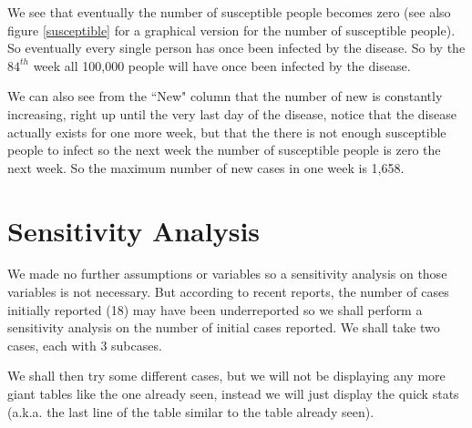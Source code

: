 \documentclass[12pt]{report}
\begin{document}


We see that eventually the number of susceptible people becomes zero (see also figure \ref{susceptible} for a graphical version for the number of susceptible people). So eventually every single person has once been infected by the disease. So by the $84^{th}$ week all 100,000 people will have once been infected by the disease.

\bigskip

We can also see from the ``New" column that the number of new is constantly increasing, right up until the very last day of the disease, notice that the disease actually exists for one more week, but that the there is not enough susceptible people to infect so the next week the number of susceptible people is zero the next week. So the maximum number of new cases in one week is 1,658.

\bigskip

\section{Sensitivity Analysis}
We made no further assumptions or variables so a sensitivity analysis on those variables is not necessary.
But according to recent reports, the number of cases initially reported (18) may have been underreported so we shall perform a sensitivity analysis on the number of initial cases reported. We shall take two cases, each with 3 subcases.

\bigskip



We shall then try some different cases, but we will not be displaying any more giant tables like the one already seen, instead we will just display the quick stats (a.k.a. the last line of the table similar to the table already seen).
\end{document}
